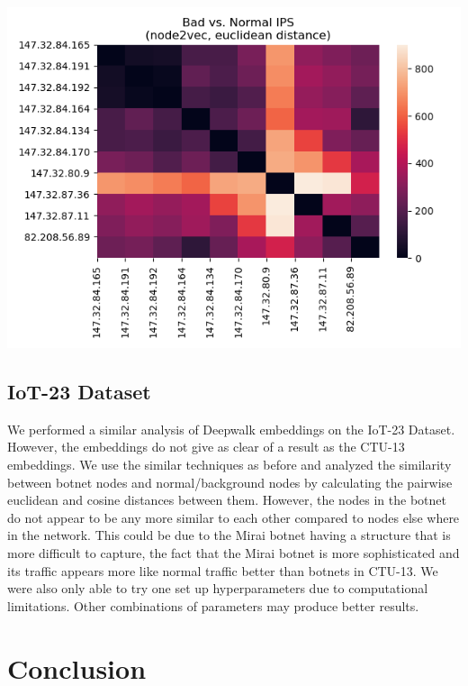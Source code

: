 \documentclass[10pt]{article}
\begin{document}
\begin{multicols}{2}
\includegraphics[scale=.5]{2b}


\subsection{IoT-23 Dataset}

We performed a similar analysis of Deepwalk embeddings on the IoT-23 Dataset. However, the embeddings do not give as clear of a result as the CTU-13 embeddings. We use the similar techniques as before and analyzed the similarity between botnet nodes and normal/background nodes by calculating the pairwise euclidean and cosine distances between them. However, the nodes in the botnet do not appear to be any more similar to each other compared to nodes else where in the network. This could be due to the Mirai botnet having a structure that is more difficult to capture, the fact that the Mirai botnet is more sophisticated and its traffic appears more like normal traffic better than botnets in CTU-13. We were also only able to try one set up hyperparameters due to computational limitations. Other combinations of parameters may produce better results. 

\section{Conclusion}


\end{multicols}
\end{document}
